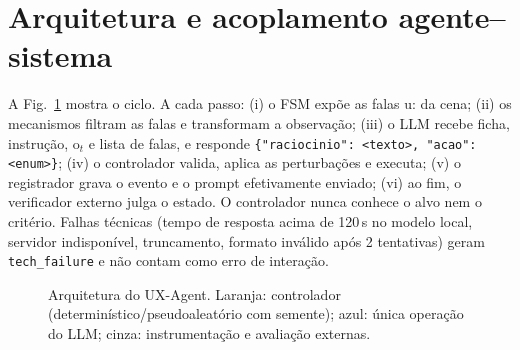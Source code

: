 \documentclass[conference]{IEEEtran}
\begin{document}
\section{Arquitetura e acoplamento agente--sistema}
A Fig.~\ref{fig:arq} mostra o ciclo. A cada passo: (i) o FSM expõe as falas u: da cena; (ii) os mecanismos filtram as falas e transformam a observação; (iii) o LLM recebe ficha, instrução, o$_t$ e lista de falas, e responde \texttt{\{"raciocinio": <texto>, "acao": <enum>\}}; (iv) o controlador valida, aplica as perturbações e executa; (v) o registrador grava o evento e o prompt efetivamente enviado; (vi) ao fim, o verificador externo julga o estado. O controlador nunca conhece o alvo nem o critério. Falhas técnicas (tempo de resposta acima de 120\,s no modelo local, servidor indisponível, truncamento, formato inválido após 2 tentativas) geram \texttt{tech\_failure} e não contam como erro de interação.

\begin{figure}[t]
\centering\footnotesize
{}
\caption{Arquitetura do UX-Agent. Laranja: controlador (determinístico/pseudoaleatório com semente); azul: única operação do LLM; cinza: instrumentação e avaliação externas.}
\label{fig:arq}
\end{figure}
\end{document}
